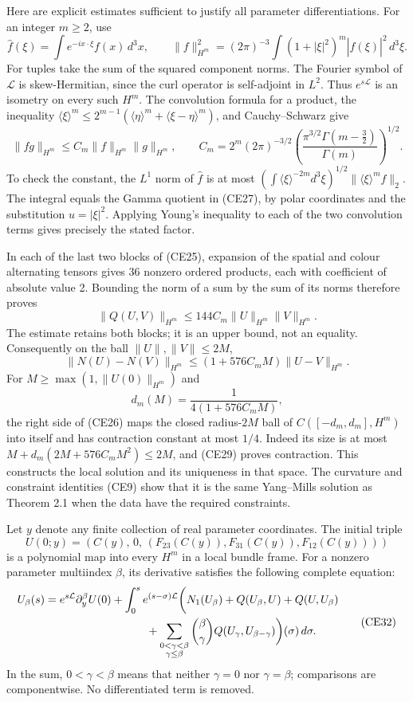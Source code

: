 \documentclass[11pt]{article}
\begin{document}
Here are explicit estimates sufficient to justify all parameter
differentiations. For an integer \(m\geq2\), use
\[
 \widehat f(\xi)=\int e^{-ix\cdot\xi}f(x)\,d^3x,\qquad
 \|f\|_{H^m}^2=(2\pi)^{-3}\int(1+|\xi|^2)^m|\widehat f(\xi)|^2\,d^3\xi.
\]
For tuples take the sum of the squared component norms.
The Fourier symbol of \(\mathcal L\) is skew-Hermitian, since the curl
operator is self-adjoint in \(L^2\). Thus \(e^{s\mathcal L}\) is an
isometry on every such \(H^m\).
The convolution formula for a product, the inequality
\(\langle\xi\rangle^m\leq2^{m-1}
(\langle\eta\rangle^m+\langle\xi-\eta\rangle^m)\), and
Cauchy–Schwarz give
\[
 \|fg\|_{H^m}\leq C_m\|f\|_{H^m}\|g\|_{H^m},\qquad
 C_m=2^m(2\pi)^{-3/2}
 \left(\frac{\pi^{3/2}\Gamma(m-\tfrac32)}{\Gamma(m)}\right)^{1/2}.
 \tag{CE27}
\]
To check the constant, the \(L^1\) norm of \(\widehat f\) is at most
\((\int\langle\xi\rangle^{-2m}d^3\xi)^{1/2}
 \|\langle\xi\rangle^m\widehat f\|_2\).
The integral equals the Gamma quotient in (CE27), by polar coordinates
and the substitution \(u=|\xi|^2\). Applying Young's inequality to
each of the two convolution terms gives precisely the stated factor.

In each of the last two blocks of (CE25), expansion of the spatial
and colour alternating tensors gives 36 nonzero ordered products,
each with coefficient of absolute value 2. Bounding the norm of a
sum by the sum of its norms therefore proves
\[
 \|Q(U,V)\|_{H^m}\leq144C_m\|U\|_{H^m}\|V\|_{H^m}.
 \tag{CE28}
\]
The estimate retains both blocks; it is an upper bound, not an equality.
Consequently on the ball \(\|U\|,\|V\|\leq2M\),
\[
 \|N(U)-N(V)\|_{H^m}
 \leq(1+576C_mM)\|U-V\|_{H^m}.
 \tag{CE29}
\]
For \(M\geq\max(1,\|U(0)\|_{H^m})\) and
\[
 d_m(M)=\frac1{4(1+576C_mM)},
 \tag{CE30}
\]
the right side of (CE26) maps the closed radius-\(2M\) ball of
\(C([-d_m,d_m],H^m)\) into itself and has contraction constant at most
\(1/4\). Indeed its size is at most
\(M+d_m(2M+576C_mM^2)\leq2M\), and (CE29) proves contraction.
This constructs the local solution and its uniqueness in that space.
The curvature and constraint identities (CE9) show that it is the
same Yang–Mills solution as Theorem 2.1 when the data have the required
constraints.

Let \(y\) denote any finite collection of real parameter coordinates.
The initial triple
\[
 U(0;y)=(C(y),\,0,\,(F_{23}(C(y)),F_{31}(C(y)),F_{12}(C(y))))
 \tag{CE31}
\]
is a polynomial map into every \(H^m\) in a local bundle frame.
For a nonzero parameter multiindex \(\beta\), its derivative satisfies
the following complete equation:
\[
 \begin{aligned}
 U_\beta(s)
 &=e^{s\mathcal L}\partial_y^\beta U(0)
 +\int_0^s e^{(s-\sigma)\mathcal L}\biggl(
 N_1(U_\beta)+Q(U_\beta,U)+Q(U,U_\beta)\\
 &\hspace{32mm}
 +\sum_{\substack{0<\gamma<\beta\\\gamma\leq\beta}}
        {\beta\choose\gamma}Q(U_\gamma,U_{\beta-\gamma})
                    \biggr)(\sigma)\,d\sigma.
 \end{aligned}\tag{CE32}
\]
In the sum, \(0<\gamma<\beta\) means that neither \(\gamma=0\) nor
\(\gamma=\beta\); comparisons are componentwise.
No differentiated term is removed.
\end{document}
